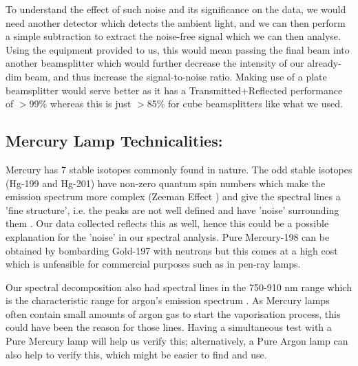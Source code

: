 \documentclass[journal]{Imperial_lab_report}
\begin{document}
To understand the effect of such noise and its significance on the data, we would need another detector which detects the ambient light, and we can then perform a simple subtraction to extract the noise-free signal which we can then analyse. Using the equipment provided to us, this would mean passing the final beam into another beamsplitter which would further decrease the intensity of our already-dim beam, and thus increase the signal-to-noise ratio. Making use of a plate beamsplitter would serve better as it has a Transmitted+Reflected performance of $>$99\% \cite{plate_bs} whereas this is just $>$85\% \cite{cube_bs} for cube beamsplitters like what we used.
\vspace{-10pt}


\subsection{Mercury Lamp Technicalities:}
Mercury has 7 stable isotopes commonly found in nature. The odd stable isotopes (Hg-199 and Hg-201) have non-zero quantum spin \cite{spin_numbers_hg} numbers which make the emission spectrum more complex (Zeeman Effect \cite{zeeman_effect}) and give the spectral lines a 'fine structure', i.e. the peaks are not well defined and have 'noise' surrounding them \cite{fine_structure}\cite{fine_structure2}. Our data collected reflects this as well, hence this could be a possible explanation for the 'noise' in our spectral analysis. Pure Mercury-198 can be obtained by bombarding Gold-197 \cite{pure_hg} with neutrons but this comes at a high cost which is unfeasible for commercial purposes such as in pen-ray lamps. 




Our spectral decomposition also had spectral lines in the 750-910 nm range which is the characteristic range for argon's emission spectrum \cite{argon_spectrum}. As Mercury lamps often contain small amounts of argon gas to start the vaporisation process, this could have been the reason for those lines. Having a simultaneous test with a Pure Mercury lamp will help us verify this; alternatively, a Pure Argon lamp can also help to verify this, which might be easier to find and use.  
\vspace{-8pt}
\end{document}
